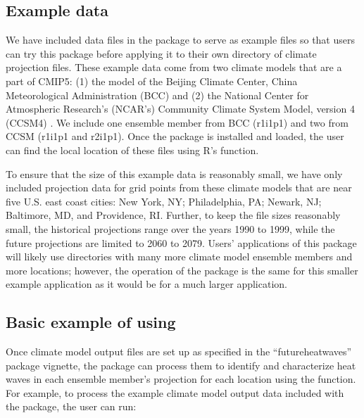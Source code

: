 \subsection{Example data}\label{example-data}

We have included data files in the package to serve as example files so
that users can try this package before applying it to their own
directory of climate projection files. These example data come from two
climate models that are a part of CMIP5: (1) the model of the Beijing
Climate Center, China Meteorological Administration (BCC)
\citep{xin2013introduction} and (2) the National Center for Atmospheric
Research's (NCAR's) Community Climate System Model, version 4 (CCSM4)
\citep{gent2011community}. We include one ensemble member from BCC
(r1i1p1) and two from CCSM (r1i1p1 and r2i1p1). Once the
 package is installed and loaded, the user can find
the local location of these files using R's  function.

To ensure that the size of this example data is reasonably small, we
have only included projection data for grid points from these climate
models that are near five U.S. east coast cities: New York, NY;
Philadelphia, PA; Newark, NJ; Baltimore, MD, and Providence, RI.
Further, to keep the file sizes reasonably small, the historical
projections range over the years 1990 to 1999, while the future
projections are limited to 2060 to 2079. Users' applications of this
package will likely use directories with many more climate model
ensemble members and more locations; however, the operation of the
package is the same for this smaller example application as it would be
for a much larger application.

\subsection{\texorpdfstring{Basic example of using
}{Basic example of using }}\label{basic-example-of-using}

Once climate model output files are set up as specified in the
``futureheatwaves'' package vignette, the package can process them to
identify and characterize heat waves in each ensemble member's
projection for each location using the  function. For
example, to process the example climate model output data included with
the package, the user can run:

